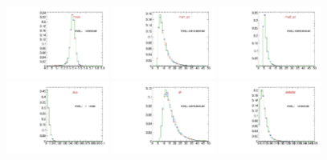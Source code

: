 \begin{figure}
  \includegraphics[width=0.3\textwidth]{Figures/VariablesComparison/MC_barrel_figs_3h/mass}
  \includegraphics[width=0.3\textwidth]{Figures/VariablesComparison/MC_barrel_figs_3h/mu1_pt}
  \includegraphics[width=0.3\textwidth]{Figures/VariablesComparison/MC_barrel_figs_3h/mu2_pt}
  \includegraphics[width=0.3\textwidth]{Figures/VariablesComparison/MC_barrel_figs_3h/dca}
  \includegraphics[width=0.3\textwidth]{Figures/VariablesComparison/MC_barrel_figs_3h/pt}
  \includegraphics[width=0.3\textwidth]{Figures/VariablesComparison/MC_barrel_figs_3h/delta3d}

\end{figure}
